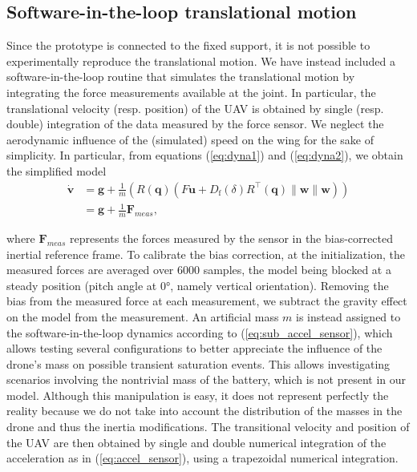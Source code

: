 \subsection{Software-in-the-loop translational motion}
Since the prototype is connected to the fixed support, it is not possible to experimentally reproduce the translational motion.  We have instead included a software-in-the-loop routine that simulates the translational motion by integrating the force measurements available at the joint. In particular, the translational velocity (resp. position) of the UAV is obtained by single (resp. double) integration of the data measured by the force sensor. We neglect the aerodynamic influence of the (simulated) speed on the wing for the sake of simplicity. In particular, from equations (\ref{eq:dyna1}) and (\ref{eq:dyna2}), we obtain the simplified model
\begin{subequations}\label{eq:accel_sensor}
\begin{align}
    \boldsymbol{\dot v} &= \boldsymbol{g} + \frac{1}{m}\left( R(\boldsymbol{q})(F\boldsymbol{u} +  D_{\text{f}}(\delta) R^\top(\boldsymbol{q})\lVert \boldsymbol{w} \rVert \boldsymbol{w}) \right)\\
    &= \boldsymbol{g} + \frac{1}{m} \boldsymbol{F}_{meas} \label{eq:sub_accel_sensor},
\end{align}
\end{subequations}

where $\boldsymbol{F}_{meas}$  represents the forces measured by the sensor in the bias-corrected inertial reference frame. To calibrate the bias correction, at the initialization, the measured forces are averaged over 6000 samples, the model being blocked at a steady position (pitch angle at 0°, namely vertical orientation). Removing the bias from the measured force at each measurement, we subtract the gravity effect on the model from the measurement. An artificial mass $m$ is instead assigned to the software-in-the-loop dynamics according to (\ref{eq:sub_accel_sensor}), which allows testing several configurations to better appreciate the influence of the drone's mass on possible transient saturation events. This allows investigating scenarios involving the nontrivial mass of the battery, which is not present in our model. Although this manipulation is easy, it does not represent perfectly the reality because we do not take into account the distribution of the masses in the drone and thus the inertia modifications.
The transitional velocity and position of the UAV are then obtained by single and double numerical integration of the acceleration as in (\ref{eq:accel_sensor}), using a trapezoidal numerical integration.



